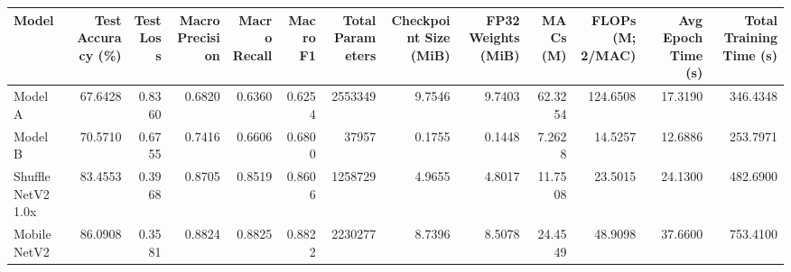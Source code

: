 \begin{tabular}{lrrrrrrrrrrrr}
\toprule
Model & Test Accuracy (\%) & Test Loss & Macro Precision & Macro Recall & Macro F1 & Total Parameters & Checkpoint Size (MiB) & FP32 Weights (MiB) & MACs (M) & FLOPs (M; 2/MAC) & Avg Epoch Time (s) & Total Training Time (s) \\
\midrule
Model A & 67.6428 & 0.8360 & 0.6820 & 0.6360 & 0.6254 & 2553349 & 9.7546 & 9.7403 & 62.3254 & 124.6508 & 17.3190 & 346.4348 \\
Model B & 70.5710 & 0.6755 & 0.7416 & 0.6606 & 0.6800 & 37957 & 0.1755 & 0.1448 & 7.2628 & 14.5257 & 12.6886 & 253.7971 \\
ShuffleNetV2 1.0x & 83.4553 & 0.3968 & 0.8705 & 0.8519 & 0.8606 & 1258729 & 4.9655 & 4.8017 & 11.7508 & 23.5015 & 24.1300 & 482.6900 \\
MobileNetV2 & 86.0908 & 0.3581 & 0.8824 & 0.8825 & 0.8822 & 2230277 & 8.7396 & 8.5078 & 24.4549 & 48.9098 & 37.6600 & 753.4100 \\
\bottomrule
\end{tabular}
